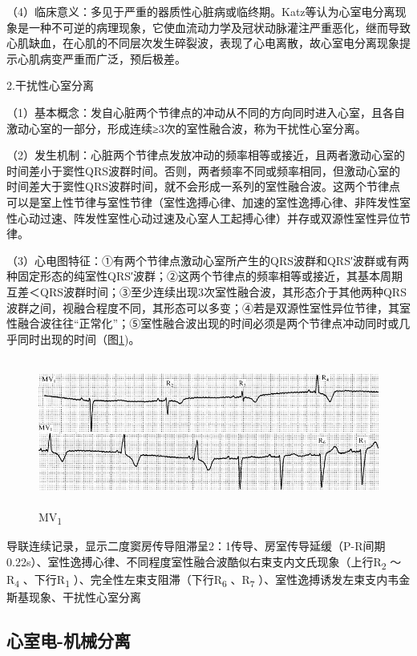 （4）临床意义：多见于严重的器质性心脏病或临终期。Katz等认为心室电分离现象是一种不可逆的病理现象，它使血流动力学及冠状动脉灌注严重恶化，继而导致心肌缺血，在心肌的不同层次发生碎裂波，表现了心电离散，故心室电分离现象提示心肌病变严重而广泛，预后极差。

2.干扰性心室分离

（1）基本概念：发自心脏两个节律点的冲动从不同的方向同时进入心室，且各自激动心室的一部分，形成连续≥3次的室性融合波，称为干扰性心室分离。

（2）发生机制：心脏两个节律点发放冲动的频率相等或接近，且两者激动心室的时间差小于窦性QRS波群时间。否则，两者频率不同或频率相同，但激动心室的时间差大于窦性QRS波群时间，就不会形成一系列的室性融合波。这两个节律点可以是室上性节律与室性节律（室性逸搏心律、加速的室性逸搏心律、非阵发性室性心动过速、阵发性室性心动过速及心室人工起搏心律）并存或双源性室性异位节律。

（3）心电图特征：①有两个节律点激动心室所产生的QRS波群和QRS′波群或有两种固定形态的纯室性QRS′波群；②这两个节律点的频率相等或接近，其基本周期互差＜QRS波群时间；③至少连续出现3次室性融合波，其形态介于其他两种QRS波群之间，视融合程度不同，其形态可以多变；④若是双源性室性异位节律，其室性融合波往往“正常化”；⑤室性融合波出现的时间必须是两个节律点冲动同时或几乎同时出现的时间（图\ref{fig30-8})。

\begin{figure}[!htbp]
 \centering
 \includegraphics[width=5.58333in,height=1.91667in]{./images/Image00503.jpg}
 \captionsetup{justification=centering}
 \caption{MV\textsubscript{1}}
 \label{fig30-8}
  \end{figure} 
导联连续记录，显示二度窦房传导阻滞呈2：1传导、房室传导延缓（P-R间期0.22s）、室性逸搏心律、不同程度室性融合波酷似右束支内文氏现象（上行R\textsubscript{2}
～R\textsubscript{4} 、下行R\textsubscript{1}
）、完全性左束支阻滞（下行R\textsubscript{6} 、R\textsubscript{7}
）、室性逸搏诱发左束支内韦金斯基现象、干扰性心室分离

\protect\hypertarget{text00037.htmlux5cux23subid435}{}{}

\subsection{心室电-机械分离}

